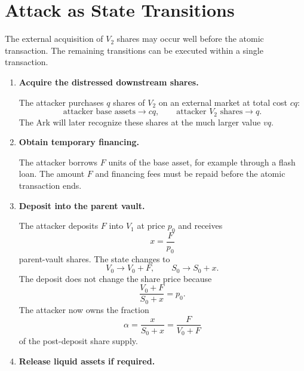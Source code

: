 \documentclass[11pt]{article}
\begin{document}
\section{Attack as State Transitions}

The external acquisition of $V_2$ shares may occur well before the atomic transaction.  The remaining transitions can be executed within a single transaction.

\begin{enumerate}
    \item \textbf{Acquire the distressed downstream shares.}

    The attacker purchases $q$ shares of $V_2$ on an external market at total cost $cq$:
    \begin{equation}
        \text{attacker base assets} \longrightarrow cq,
        \qquad
        \text{attacker }V_2\text{ shares} \longrightarrow q.
    \end{equation}
    The Ark will later recognize these shares at the much larger value $vq$.

    \item \textbf{Obtain temporary financing.}

    The attacker borrows $F$ units of the base asset, for example through a flash loan.  The amount $F$ and financing fees must be repaid before the atomic transaction ends.

    \item \textbf{Deposit into the parent vault.}

    The attacker deposits $F$ into $V_1$ at price $p_0$ and receives
    \begin{equation}
        x = \frac{F}{p_0}
    \end{equation}
    parent-vault shares.  The state changes to
    \begin{equation}
        V_0 \longrightarrow V_0+F,
        \qquad
        S_0 \longrightarrow S_0+x.
    \end{equation}
    The deposit does not change the share price because
    \begin{equation}
        \frac{V_0+F}{S_0+x}=p_0.
    \end{equation}
    The attacker now owns the fraction
    \begin{equation}
        \alpha = \frac{x}{S_0+x}
               = \frac{F}{V_0+F}
    \end{equation}
    of the post-deposit share supply.

    \item \textbf{Release liquid assets if required.}


\end{enumerate}
\end{document}
